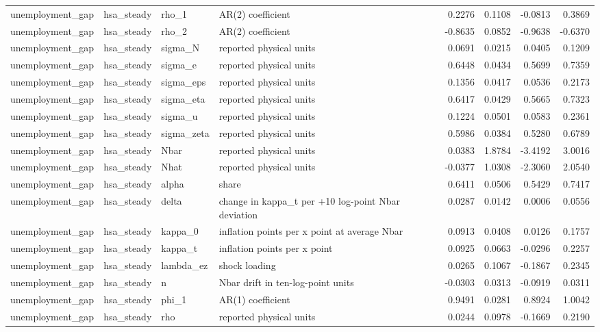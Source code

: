 \begin{tabular}{llllrrrr}
unemployment\_gap & hsa\_steady & rho\_1 & AR(2) coefficient & 0.2276 & 0.1108 & -0.0813 & 0.3869 \\
unemployment\_gap & hsa\_steady & rho\_2 & AR(2) coefficient & -0.8635 & 0.0852 & -0.9638 & -0.6370 \\
unemployment\_gap & hsa\_steady & sigma\_N & reported physical units & 0.0691 & 0.0215 & 0.0405 & 0.1209 \\
unemployment\_gap & hsa\_steady & sigma\_e & reported physical units & 0.6448 & 0.0434 & 0.5699 & 0.7359 \\
unemployment\_gap & hsa\_steady & sigma\_eps & reported physical units & 0.1356 & 0.0417 & 0.0536 & 0.2173 \\
unemployment\_gap & hsa\_steady & sigma\_eta & reported physical units & 0.6417 & 0.0429 & 0.5665 & 0.7323 \\
unemployment\_gap & hsa\_steady & sigma\_u & reported physical units & 0.1224 & 0.0501 & 0.0583 & 0.2361 \\
unemployment\_gap & hsa\_steady & sigma\_zeta & reported physical units & 0.5986 & 0.0384 & 0.5280 & 0.6789 \\
unemployment\_gap & hsa\_steady & Nbar & reported physical units & 0.0383 & 1.8784 & -3.4192 & 3.0016 \\
unemployment\_gap & hsa\_steady & Nhat & reported physical units & -0.0377 & 1.0308 & -2.3060 & 2.0540 \\
unemployment\_gap & hsa\_steady & alpha & share & 0.6411 & 0.0506 & 0.5429 & 0.7417 \\
unemployment\_gap & hsa\_steady & delta & change in kappa\_t per +10 log-point Nbar deviation & 0.0287 & 0.0142 & 0.0006 & 0.0556 \\
unemployment\_gap & hsa\_steady & kappa\_0 & inflation points per x point at average Nbar & 0.0913 & 0.0408 & 0.0126 & 0.1757 \\
unemployment\_gap & hsa\_steady & kappa\_t & inflation points per x point & 0.0925 & 0.0663 & -0.0296 & 0.2257 \\
unemployment\_gap & hsa\_steady & lambda\_ez & shock loading & 0.0265 & 0.1067 & -0.1867 & 0.2345 \\
unemployment\_gap & hsa\_steady & n & Nbar drift in ten-log-point units & -0.0303 & 0.0313 & -0.0919 & 0.0311 \\
unemployment\_gap & hsa\_steady & phi\_1 & AR(1) coefficient & 0.9491 & 0.0281 & 0.8924 & 1.0042 \\
unemployment\_gap & hsa\_steady & rho & reported physical units & 0.0244 & 0.0978 & -0.1669 & 0.2190 \\

\end{tabular}
